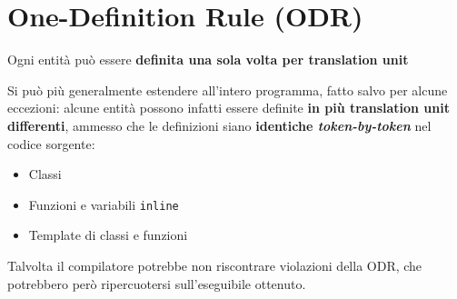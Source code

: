 \documentclass[10pt, oneside]{book}
\begin{document}
\section{One-Definition Rule (ODR)}
\begin{center}Ogni entità può essere \textbf{definita una sola volta per translation unit}\end{center}
Si può più generalmente estendere all'intero programma, fatto salvo per alcune eccezioni: alcune entità possono infatti essere definite \textbf{in più translation unit differenti}, ammesso che le definizioni siano \textbf{identiche \textit{token-by-token}} nel codice sorgente:
\begin{itemize}
\item Classi
\item Funzioni e variabili \texttt{inline}
\item Template di classi e funzioni
\end{itemize}
Talvolta il compilatore potrebbe non riscontrare violazioni della ODR, che potrebbero però ripercuotersi sull'eseguibile ottenuto.
\end{document}
